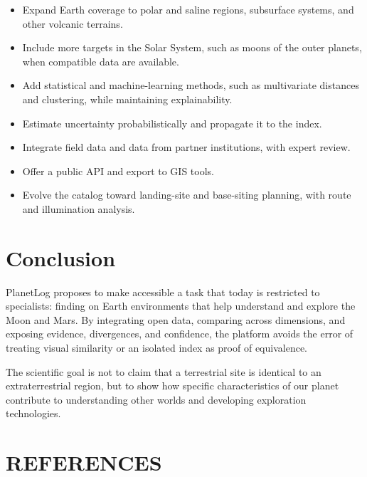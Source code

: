 \documentclass[12pt,letterpaper]{article}
\begin{document}
\begin{itemize}
  \item Expand Earth coverage to polar and saline regions, subsurface systems, and other volcanic terrains.
  \item Include more targets in the Solar System, such as moons of the outer planets, when compatible data are available.
  \item Add statistical and machine-learning methods, such as multivariate distances and clustering, while maintaining explainability.
  \item Estimate uncertainty probabilistically and propagate it to the index.
  \item Integrate field data and data from partner institutions, with expert review.
  \item Offer a public API and export to GIS tools.
  \item Evolve the catalog toward landing-site and base-siting planning, with route and illumination analysis.
\end{itemize}

\section{Conclusion}

PlanetLog proposes to make accessible a task that today is restricted to specialists: finding on Earth environments that help understand and explore the Moon and Mars. By integrating open data, comparing across dimensions, and exposing evidence, divergences, and confidence, the platform avoids the error of treating visual similarity or an isolated index as proof of equivalence.

The scientific goal is not to claim that a terrestrial site is identical to an extraterrestrial region, but to show how specific characteristics of our planet contribute to understanding other worlds and developing exploration technologies.

\section*{\sffamily\bfseries REFERENCES}
\end{document}

